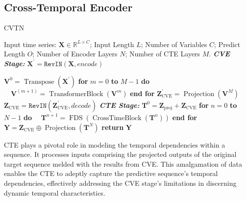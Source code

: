 \subsection{Cross-Temporal Encoder}
\begin{algorithm*}[!htbp]
  \caption{CVTN}\label{algo:cvt}
  \begin{algorithmic}[1]
    \Require
    Input time series: $\mathbf{X} \in \mathbb{R}^{L \times C}$; Input Length $L$; Number of Variables $C$; Predict Length $O$; Number of Encoder Layers $N$; Number of CTE Layers $M$.
    \State \textit{\textbf{CVE Stage:}}
    \State $\mathbf{X}^{\prime} = \texttt{RevIN}(\mathbf{X},encode)$

    \State $\mathbf{V}^0 = \operatorname{Transpose}(\mathbf{X}^{\prime})$
    \State \textbf{for} $m = 0$ \textbf{to} $M-1$ \textbf{do}
    \State $\quad \mathbf{V}^{(m+1)} = \operatorname{TransformerBlock}(\mathbf{V}^m)$
    \State \textbf{end for} 
    \State $\mathbf{Z}^{\prime}_{\text{CVE}} = \operatorname{Projection}(\mathbf{V}^M)$ 
    \State $\mathbf{Z}_{\text{CVE}} = \texttt{RevIN}(\mathbf{Z}^{\prime}_{\text{CVE}},decode)$ 
    \State \textit{\textbf{CTE Stage:}}
    \State $\mathbf{T}^0 = \mathbf{Z}_{\text{proj}} + \mathbf{Z}_{\text{CVE}}$ 
    \State \textbf{for} $n = 0$ \textbf{to} $N-1$ \textbf{do}
    \State $\quad \mathbf{T}^{n+1} = \operatorname{FDS}(\operatorname{CrossTimeBlock}(\mathbf{T}^n))$
    \State \textbf{end for}  
    \State $\mathbf{Y} = \mathbf{Z}_{\text{CVE}} \oplus \operatorname{Projection}(\mathbf{T}^N)$ 
    \State \textbf{return} $\mathbf{Y}$
  \end{algorithmic}
\end{algorithm*}
CTE plays a pivotal role in modeling the temporal dependencies within a sequence. It processes inputs comprising the projected outputs of the original target sequence melded with the results from CVE. This amalgamation of data enables the CTE to adeptly capture the predictive sequence's temporal dependencies, effectively addressing the CVE stage's limitations in discerning dynamic temporal characteristics.

